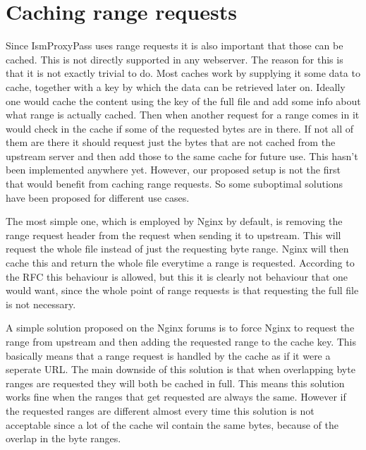 \documentclass[twoside,openright]{uva-bachelor-thesis}
\begin{document}
\section{Caching range requests}
Since IsmProxyPass uses range requests it is also important that those can be
cached. This is not directly supported in any webserver. The reason for
this is that it is not exactly trivial to do. Most caches work by supplying it
some data to cache, together with a key by which the data can be retrieved later
on.
Ideally one would cache the content using the key of the full file and add some
info about what range is actually cached. Then when another request for a range
comes in it would check in the cache if some of the requested bytes are in
there. If not all of them are there it should request just the bytes that are
not cached from the upstream server and then add those to the same cache for
future use. This hasn't been implemented anywhere yet. However, our proposed
setup is not the first that would benefit from caching range requests. So some
suboptimal solutions have been proposed for different use cases.

The most simple one, which is employed by Nginx by default,
is removing the range request header from the request when sending it to
upstream. This will request the whole file instead of just the requesting byte
range. Nginx will then cache this and return the whole file everytime a range is
requested. According to the RFC this behaviour is allowed, but this it is
clearly not behaviour that one would want, since the whole point of range
requests is that requesting the full file is not necessary.

A simple solution proposed on the Nginx forums\autocite{nginxcacheforum} is to
force Nginx to request the range from upstream and then adding the requested
range to the cache key. This basically means that a range request is handled by
the cache as if it were a seperate URL. The main downside of this solution is that
when overlapping byte ranges are requested they will both be cached in full.
This means this  solution works fine when the ranges that get requested are
always the same. However if the requested ranges are different almost every
time this solution is not acceptable since a lot of the cache wil contain the
same bytes, because of the overlap in the byte ranges.

\end{document}
